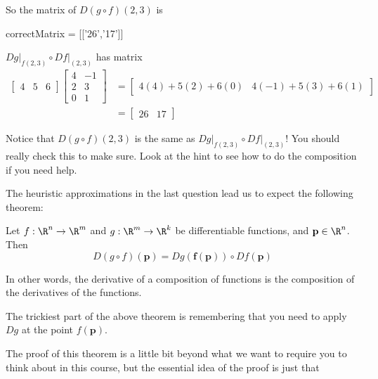 \documentclass{ximera}
\begin{document}
\begin{question}
	\begin{solution}
		So the matrix of $D(g \circ f)(2,3)$ is 
		\begin{matrix-answer}[name =J]
			correctMatrix  = [['26','17']]
		\end{matrix-answer}
	\end{solution}
	
	\begin{hint}
		$Dg\big|_{f(2,3)} \circ Df\big|_{(2,3)}$ has matrix 
		\begin{align*}
		\begin{bmatrix} 4&5&6 \end{bmatrix}\begin{bmatrix}  4 & -1 \\2& 3\\ 0 &1\end{bmatrix}  &= \begin{bmatrix} 4(4)+5(2)+6(0) & 4(-1)+5(3)+6(1)\end{bmatrix}\\
		&= \begin{bmatrix} 26& 17\end{bmatrix}
		\end{align*}
	\end{hint}
	Notice that $D(g \circ f)(2,3)$ is the same as $Dg\big|_{f(2,3)} \circ Df\big|_{(2,3)}$!  You should really check this to make sure.  
	Look at the hint to see how to do the composition if you need help.
	
\end{question}

The heuristic approximations in the last question lead us to expect the following theorem:

\begin{theorem}
	Let $f:\R^n \to \R^m$ and $g: \R^m \to \R^k$ be differentiable functions, and $\mathbf{p} \in \R^n$.  Then 
	\[
		D(g \circ f)(\mathbf{p}) = Dg(\mathbf{f(p)}) \circ Df(\mathbf{p})
	\]
	
	In other words, the derivative of a composition of functions is the composition of the derivatives of the functions.
\end{theorem}

The trickiest part of the above theorem is remembering that you need to apply $Dg$ at the point $f(\mathbf{p})$.

The proof of this theorem is a little bit beyond what we want to require you to think about in this course, but the essential idea of the proof is just that
\end{document}
